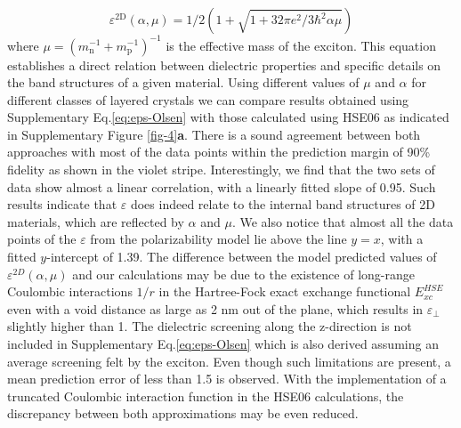 \documentclass[journal=ancac3,manuscript=article,email=true,hyperref=true,keywords=true]{achemso}
\begin{document}
\begin{equation}
\label{eq:eps-Olsen}
\varepsilon^{\mathrm{2D}}(\alpha, \mu) = 1/2 (1 + \sqrt{1 + 32\pi e^2/3\hbar^2 \alpha \mu})
\end{equation}
where \(\mu=(m_{\mathrm{n}}^{-1} + m_{\mathrm{p}}^{-1})^{-1}\) is the
effective mass of the exciton. This equation 
establishes a direct relation between dielectric properties 
and specific details on the band structures of a given material. 
Using different values of $\mu$ and $\alpha$ for different classes of layered crystals
we can compare results obtained using Supplementary Eq.\ref{eq:eps-Olsen} with those calculated 
using HSE06 as indicated in Supplementary Figure \ref{fig-4}{\bf a}.  %
There is a sound agreement between both approaches with most of the data points within 
the prediction margin of 90\% fidelity as shown in the violet stripe. 
Interestingly, we find that the two sets of data show almost a
linear correlation, with a linearly fitted slope of 0.95. Such results
indicate that \(\varepsilon\) does indeed relate to the internal band structures
of 2D materials, which are reflected by \(\alpha\) and \(\mu\). We also
notice that almost all the data points of the \(\varepsilon\) from the
polarizability model lie above the line \(y=x\), with a fitted
$y$-intercept of 1.39. The difference between the model predicted values of 
$\varepsilon^{2D}(\alpha, \mu)$ and our calculations 
may be due to the existence of long-range
Coulombic interactions $1/r$ in the Hartree-Fock exact 
exchange functional $E_{xc}^{HSE}$ even with a void
distance as large as 2 nm out of the plane, which results in \(\varepsilon_{\perp}\)
slightly higher than 1. 
The dielectric screening along the 
z-direction is not included in Supplementary Eq.\ref{eq:eps-Olsen} which is also derived assuming 
an average screening felt by the exciton. Even though such limitations are present, 
a mean prediction error of less than 1.5 is observed. With the implementation 
of a truncated Coulombic interaction function in the HSE06 
calculations\cite{Hueser_2013_2Dvs3D},
the discrepancy between both approximations may be even reduced. 
\end{document}
